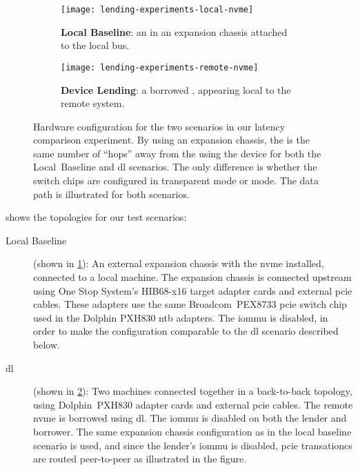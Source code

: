 \begin{figure}
    \centering
    \begin{subfigure}{\linewidth}
        \centering
        \texttt{[image: lending-experiments-local-nvme]}
        \caption{\textbf{Local Baseline}: an  in an expansion chassis attached to the local  bus.}
        \label{fig:eval-lending-nvme-local}
    \end{subfigure}
    \par\vspace{10mm}
    \begin{subfigure}{\linewidth}
        \centering
        \texttt{[image: lending-experiments-remote-nvme]}
        \caption{\textbf{Device Lending}: a borrowed , appearing local to the remote system.}
        \label{fig:eval-lending-nvme-remote}
    \end{subfigure}
    \par\vspace{5mm}
    \caption[Hardware configuration for the two scenarios in our latency comparison experiment. By using an expansion chassis, the  is the same number of ``hops'' away from the  using the device for both scenarios]
    {Hardware configuration for the two scenarios in our latency comparison experiment. By using an expansion chassis, the  is the same number of ``hops'' away from the  using the device for both the Local~Baseline and \gls{dl} scenarios. The only difference is whether the switch chips are configured in transparent mode or  mode. The data path is illustrated for both scenarios.}
    \label{fig:eval-lending-nvme-topo}
\end{figure}
%
 shows the topologies for our test scenarios:
\begin{description}
    \item[Local Baseline] (shown in \cref{fig:eval-lending-nvme-local}):%
        An external expansion chassis with the \gls{nvme} installed, connected to a local machine. 
        The expansion chassis is connected upstream using One Stop System's HIB68-x16 target adapter cards and external \gls{pcie} cables. 
        These adapters use the same Broadcom~PEX8733 \gls{pcie} switch chip used in the Dolphin PXH830 \gls{ntb} adapters.
        The \gls{iommu} is disabled, in order to make the configuration comparable to the \gls{dl} scenario described below.
        
    \item[\Gls{dl}] (shown in \cref{fig:eval-lending-nvme-remote}):
        Two machines connected together in a back-to-back topology, using Dolphin~PXH830 adapter cards and external \gls{pcie} cables.
        The remote \gls{nvme} is borrowed using \gls{dl}.
        The \gls{iommu} is disabled on both the \gls{lender} and \gls{borrower}.
        The same expansion chassis configuration as in the local baseline scenario is used, and since the \gls{lender}'s \gls{iommu} is disabled, \gls{pcie} transationcs are routed peer-to-peer as illustrated in the figure.
\end{description}
